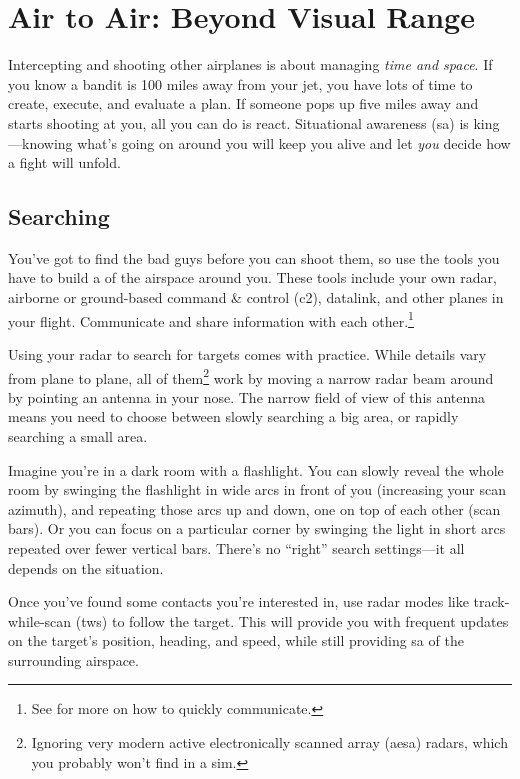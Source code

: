 \chapter{Air to Air: Beyond Visual Range}

Intercepting and shooting other airplanes is about managing \emph{time and space}.
If you know a bandit is 100 miles away from your jet,
you have lots of time to create, execute, and evaluate a plan.
If someone pops up five miles away and starts shooting at you,
all you can do is react.
Situational awareness \ac{(sa)} is king---knowing what's going on around
you will keep you alive and let \emph{you} decide how a fight will unfold.

\section{Searching}

You've got to find the bad guys before you can shoot them,
so use the tools you have to build a  of the airspace
around you.
These tools include your own radar,
airborne or ground-based command \& control \ac{(c2)},
datalink, and other planes in your flight.
Communicate and share information with each other.\punckern\footnote{See
 for more on how to quickly communicate.}

Using your radar to search for targets comes with practice.
While details vary from plane to plane,
all of them\footnote{Ignoring very modern active electronically scanned array
\ac{(aesa)} radars, which you probably won't find in a sim.}
work by moving a narrow radar beam around by pointing an antenna in your nose.
The narrow field of view of this antenna means you need to choose between
slowly searching a big area, or rapidly searching a small area.

Imagine you're in a dark room with a flashlight.
You can slowly reveal the whole room by swinging the flashlight in wide arcs
in front of you (increasing your scan azimuth),
and repeating those arcs up and down, one on top of each other
(scan bars).
Or you can focus on a particular corner by swinging the light in short arcs
repeated over fewer vertical bars.
There's no ``right'' search settings---it
all depends on the situation.

Once you've found some contacts you're interested in,
use radar modes like track-while-scan \ac{(tws)} to follow the target.
This will provide you with frequent updates on the target's position, heading,
and speed, while still providing \ac{sa} of the surrounding airspace.

